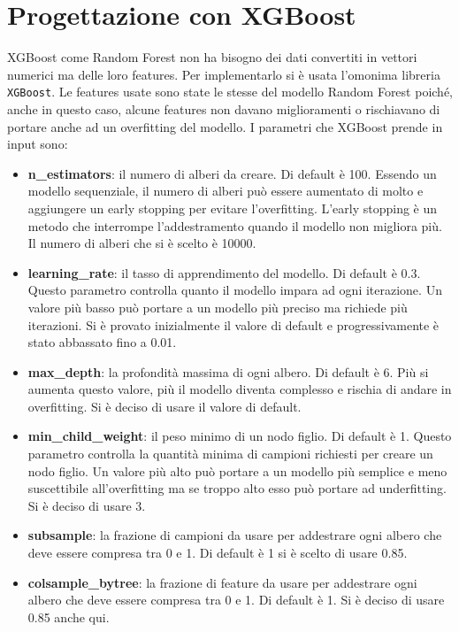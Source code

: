 \documentclass[12pt,a4paper,openright,twoside]{book}
\begin{document}
\section{Progettazione con XGBoost}
XGBoost come Random Forest non ha bisogno dei dati convertiti in vettori numerici
ma delle loro features.
Per implementarlo si è usata l'omonima libreria \texttt{XGBoost}.
Le features usate sono state le stesse del modello Random Forest poiché,
anche in questo caso, alcune features non davano miglioramenti o rischiavano
di portare anche ad un overfitting del modello.
I parametri che XGBoost prende in input sono:
\begin{itemize}
    \item \textbf{n\_estimators}: il numero di alberi da creare.
    Di default è 100. Essendo un modello sequenziale, il numero di alberi
    può essere aumentato di molto e aggiungere un early stopping
    per evitare l'overfitting. L'early stopping è un metodo che interrompe
    l'addestramento quando il modello non migliora più. Il numero
    di alberi che si è scelto è 10000.
    \item \textbf{learning\_rate}: il tasso di apprendimento del modello.
    Di default è 0.3. Questo parametro controlla quanto il modello
    impara ad ogni iterazione. Un valore più basso può portare a un modello
    più preciso ma richiede più iterazioni.
    Si è provato inizialmente il valore di default e progressivamente
    è stato abbassato fino a 0.01.
    \item \textbf{max\_depth}: la profondità massima di ogni albero.
    Di default è 6. Più si aumenta questo valore, più il modello
    diventa complesso e rischia di andare in overfitting.
    Si è deciso di usare il valore di default.
    \item \textbf{min\_child\_weight}: il peso minimo di un nodo figlio.
    Di default è 1. Questo parametro controlla la quantità minima
    di campioni richiesti per creare un nodo figlio. Un valore più alto
    può portare a un modello più semplice e meno suscettibile all'overfitting
    ma se troppo alto esso può portare ad underfitting.
    Si è deciso di usare 3.
    \item \textbf{subsample}: la frazione di campioni da usare per addestrare
    ogni albero che deve essere compresa tra 0 e 1. Di default è 1
    si è scelto di usare 0.85.
    \item \textbf{colsample\_bytree}: la frazione di feature da usare per addestrare
    ogni albero che deve essere compresa tra 0 e 1. Di default è 1.
    Si è deciso di usare 0.85 anche qui.

\end{itemize}
\end{document}
